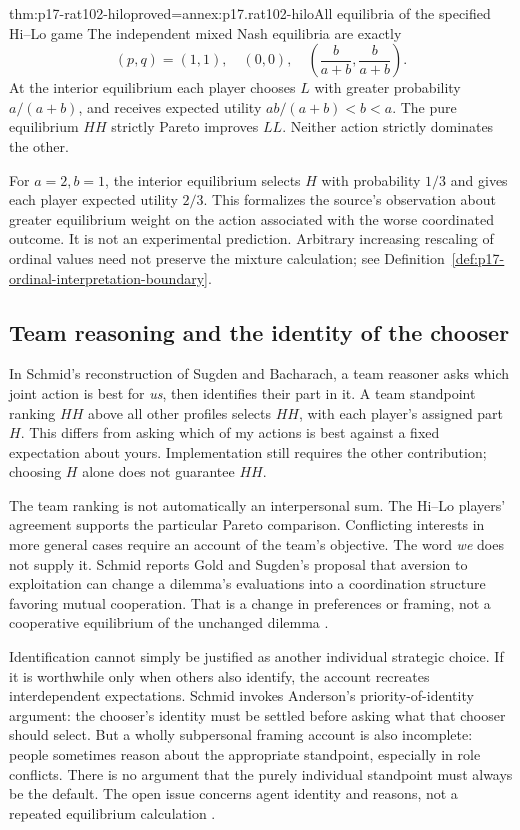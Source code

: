 \begin{hbtheorem}{thm:p17-rat102-hilo}{proved=annex:p17.rat102-hilo}{All equilibria of the specified Hi--Lo game}
The independent mixed Nash equilibria are exactly
\[
 (p,q)=(1,1),\quad(0,0),\quad
 \left(\frac{b}{a+b},\frac{b}{a+b}\right).
\]
At the interior equilibrium each player chooses \(L\) with greater
probability \(a/(a+b)\), and receives expected utility
\(ab/(a+b)<b<a\). The pure equilibrium \(HH\) strictly Pareto improves
\(LL\). Neither action strictly dominates the other.
\end{hbtheorem}

For \(a=2,b=1\), the interior equilibrium selects \(H\) with probability
\(1/3\) and gives each player expected utility \(2/3\). This formalizes
the source's observation about greater equilibrium weight on the action
associated with the worse coordinated outcome. It is not an experimental
prediction. Arbitrary increasing rescaling of ordinal values need not
preserve the mixture calculation; see
Definition~\ref{def:p17-ordinal-interpretation-boundary}.

\subsection{Team reasoning and the identity of the chooser}

In Schmid's reconstruction of Sugden and Bacharach, a team reasoner asks
which joint action is best for \emph{us}, then identifies their part in
it. A team standpoint ranking \(HH\) above all other profiles selects
\(HH\), with each player's assigned part \(H\). This differs from asking
which of my actions is best against a fixed expectation about yours.
Implementation still requires the other contribution; choosing \(H\)
alone does not guarantee \(HH\).

The team ranking is not automatically an interpersonal sum. The Hi--Lo
players' agreement supports the particular Pareto comparison. Conflicting
interests in more general cases require an account of the team's objective.
The word \emph{we} does not supply it. Schmid reports Gold and Sugden's
proposal that aversion to exploitation can change a dilemma's evaluations
into a coordination structure favoring mutual cooperation. That is a change
in preferences or framing, not a cooperative equilibrium of the unchanged
dilemma \parencite[p.~594]{Schmid2021CollectiveRationality}.

Identification cannot simply be justified as another individual strategic
choice. If it is worthwhile only when others also identify, the account
recreates interdependent expectations. Schmid invokes Anderson's
priority-of-identity argument: the chooser's identity must be settled
before asking what that chooser should select. But a wholly subpersonal
framing account is also incomplete: people sometimes reason about the
appropriate standpoint, especially in role conflicts. There is no argument
that the purely individual standpoint must always be the default. The open
issue concerns agent identity and reasons, not a repeated equilibrium
calculation \parencite[p.~594]{Schmid2021CollectiveRationality}.

